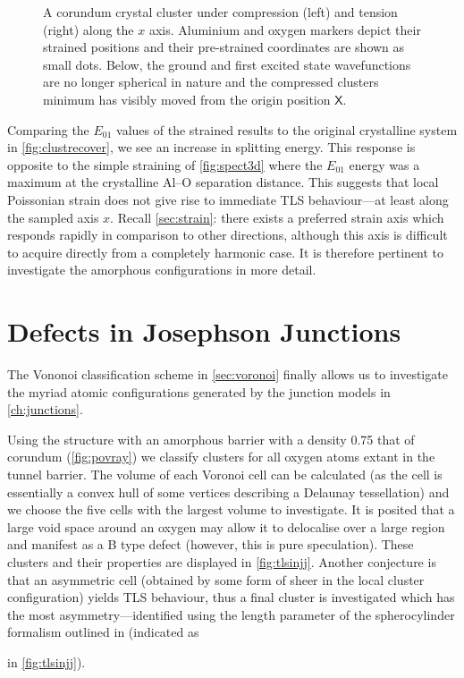 \begin{figure}[htp]
\resizebox{\textwidth}{!}{}
\caption[Strain on a Crystalline Lattice]{\label{fig:cluststrain}A corundum crystal cluster under compression (left) and tension (right) along the $x$ axis. Aluminium  and oxygen  markers depict their strained positions and their pre-strained coordinates are shown as small dots. Below, the ground and first excited state wavefunctions are no longer spherical in nature and the compressed clusters minimum has visibly moved from the origin position {\color{Set1-5-2} $\mathsf{X}$}.}
\end{figure}

Comparing the $E_{01}$ values of the strained results to the original crystalline system in \cref{fig:clustrecover}, we see an increase in splitting energy.
This response is opposite to the simple straining of \cref{fig:spect3d} where the $E_{01}$ energy was a maximum at the crystalline Al--O separation distance.
This suggests that local Poissonian strain does not give rise to immediate TLS behaviour---at least along the sampled axis $x$.
Recall \cref{sec:strain}: there exists a preferred strain axis which responds rapidly in comparison to other directions, although this axis is difficult to acquire directly from a completely harmonic case.
It is therefore pertinent to investigate the amorphous configurations in more detail.

\section{Defects in Josephson Junctions}\label{sec:jjtls}

The Vononoi classification scheme in \cref{sec:voronoi} finally allows us to investigate the myriad atomic configurations generated by the junction models in \cref{ch:junctions}.

Using the structure with an  amorphous barrier with a density 0.75 that of corundum (\cref{fig:povray}) we classify clusters for all oxygen atoms extant in the tunnel barrier.
The volume of each Voronoi cell can be calculated (as the cell is essentially a convex hull of some vertices describing a Delaunay tessellation) and we choose the five cells with the largest volume to investigate.
It is posited that a large void space around an oxygen may allow it to delocalise over a large region and manifest as a B type defect (however, this is pure speculation).
These clusters and their properties are displayed in \cref{fig:tlsinjj}.
Another conjecture is that an asymmetric cell (obtained by some form of sheer in the local cluster configuration) yields TLS behaviour, thus a final cluster is investigated which has the most asymmetry---identified using the length parameter of the spherocylinder formalism outlined in  (indicated as  in \cref{fig:tlsinjj}).

